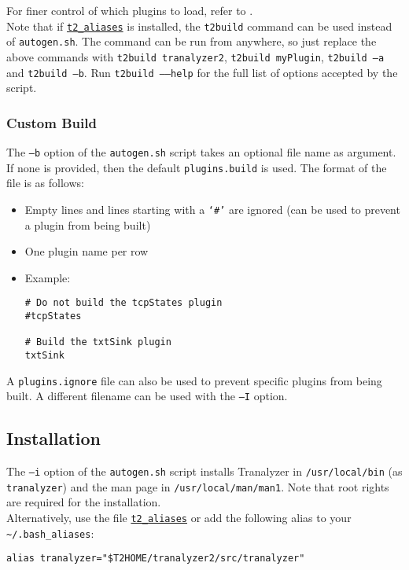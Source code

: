 For finer control of which plugins to load, refer to .\\

Note that if \hyperref[s:aliases]{\tt t2\_aliases} is installed, the {\tt t2build} command can be used instead of {\tt autogen.sh}.
The command can be run from anywhere, so just replace the above commands with
{\tt t2build tranalyzer2},
{\tt t2build myPlugin},
{\tt t2build --a} and {\tt t2build --b}.
Run {\tt t2build --{}--help} for the full list of options accepted by the script.

\subsubsection{Custom Build}\label{autogenb}
The {\tt --b} option of the {\tt autogen.sh} script takes an optional file name as argument.
If none is provided, then the default {\tt plugins.build} is used.
The format of the file is as follows:
\begin{itemize}
    \item Empty lines and lines starting with a {\tt `\#'} are ignored (can be used to prevent a plugin from being built)
    \item One plugin name per row
    \item Example:
\begin{verbatim}
# Do not build the tcpStates plugin
#tcpStates

# Build the txtSink plugin
txtSink
\end{verbatim}
\end{itemize}

A {\tt plugins.ignore} file can also be used to prevent specific plugins from being built. A different filename can be used with the {\tt --I} option.

\subsection{Installation}\label{t2install}
The {\tt --i} option of the {\tt autogen.sh} script installs Tranalyzer in {\tt /usr/local/bin} (as {\tt tranalyzer}) and the man page in {\tt /usr/local/man/man1}. Note that root rights are required for the installation.\\

Alternatively, use the file \hyperref[s:aliases]{\tt t2\_aliases} or add the following alias to your {\tt \textasciitilde{}/.bash\_aliases}:

\begin{center}
{\tt alias tranalyzer="\$T2HOME/tranalyzer2/src/tranalyzer"}\\
\end{center}

